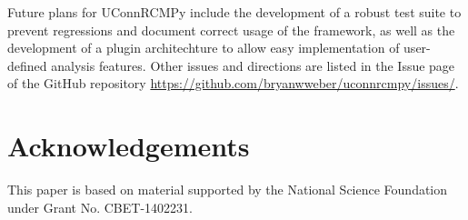 \documentclass[12pt]{../ussci}
\begin{document}
Future plans for UConnRCMPy include the development of a robust test suite to
prevent regressions and document correct usage of the framework, as well as the
development of a plugin architechture to allow easy implementation of
user-defined analysis features. Other issues and directions are listed in the
Issue page of the GitHub repository
\url{https://github.com/bryanwweber/uconnrcmpy/issues/}.

\section{Acknowledgements}\label{acknowledgements}

This paper is based on material supported by the National Science
Foundation under Grant No. CBET-1402231.

\printbibliography
\end{document}
